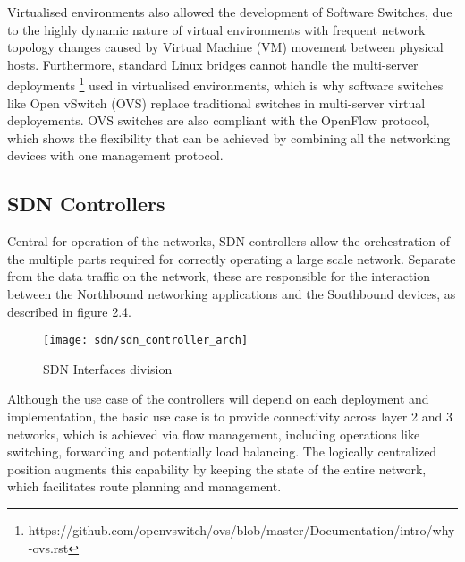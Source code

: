 \begin {enumerate}
\begin{enumerate}
\par Virtualised environments also allowed the development of Software Switches, due to the highly dynamic nature of virtual environments with frequent network 
topology changes caused by Virtual Machine (VM) movement between physical hosts.  Furthermore, standard Linux bridges cannot handle the multi-server
deployments \footnote {https://github.com/openvswitch/ovs/blob/master/Documentation/intro/why-ovs.rst} used in virtualised environments, which is why software 
switches like Open vSwitch (OVS) replace traditional switches in multi-server virtual deployements. OVS switches are also compliant with the OpenFlow
protocol, which shows the flexibility that can be achieved by combining all the networking devices with one management protocol. 

\subsection {SDN Controllers}

Central for operation of the networks, SDN controllers allow the orchestration of the multiple parts required for correctly operating a large scale network.
Separate from the data traffic on the network, these are responsible for the interaction between the Northbound networking applications and the Southbound
devices, as described in figure 2.4.

\begin{figure}[!tbph]
  \centering
  \texttt{[image: sdn/sdn\_controller\_arch]}
  \label{fig:sdn_interf_xx}
  \caption {SDN Interfaces division}
\end{figure}

\par Although the use case of the controllers will depend on each deployment and implementation, the basic use case is to provide connectivity across layer 2 and 3
networks, which is achieved via flow management, including operations like switching, forwarding and potentially load balancing. The logically centralized
position augments this capability by keeping the state of the entire network, which facilitates route planning and management. 


\end{enumerate}
\end{enumerate}
